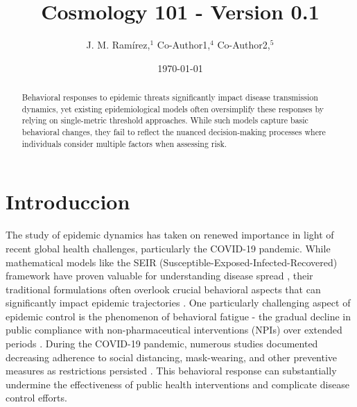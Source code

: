\documentclass{article}\usepackage{graphicx} \usepackage{amsmath} \usepackage{colortbl}\title{Cosmology 101 - Version 0.1}
\author{J. M. Ram{\'i}rez,$^{1}$ Co-Author1,$^{4}$ Co-Author2,$^{5}$}
\date{\today}
\begin{document}
\maketitle\begin{abstract}    
Behavioral responses to epidemic threats significantly impact disease transmission dynamics, yet existing epidemiological models often oversimplify these responses by relying on single-metric threshold approaches. While such models capture basic behavioral changes, they fail to reflect the nuanced decision-making processes where individuals consider multiple factors when assessing risk.         %
\end{abstract}\section{Introduccion}
The study of epidemic dynamics has taken on renewed importance in light of recent global health challenges, particularly the COVID-19 pandemic. While mathematical models like the SEIR (Susceptible-Exposed-Infected-Recovered) framework have proven valuable for understanding disease spread \cite{kermack1927contribution}, their traditional formulations often overlook crucial behavioral aspects that can significantly impact epidemic trajectories \cite{funk2010modelling}.
One particularly challenging aspect of epidemic control is the phenomenon of behavioral fatigue - the gradual decline in public compliance with non-pharmaceutical interventions (NPIs) over extended periods \cite{harvey2020covid}. During the COVID-19 pandemic, numerous studies documented decreasing adherence to social distancing, mask-wearing, and other preventive measures as restrictions persisted \cite{petherick2021worldwide}. This behavioral response can substantially undermine the effectiveness of public health interventions and complicate disease control efforts.
\end{document}
